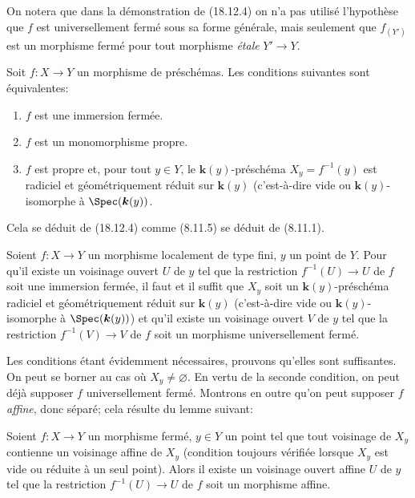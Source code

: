 \begin{remark}[18.12.5]
\label{IV.18.12.5}
On notera que dans la démonstration de (18.12.4) on n'a pas utilisé l'hypothèse que $f$ est universellement fermé sous sa forme générale, mais seulement que $f_{(Y')}$ est un morphisme fermé pour tout morphisme \emph{étale} $Y'\to Y$.
\end{remark}

\begin{corollary}[18.12.6]
\label{IV.18.12.6}
Soit $f:X\to Y$ un morphisme de préschémas. Les conditions suivantes sont équivalentes:
\begin{enumerate}
  \item[\textup{a)}] $f$ est une immersion fermée.
  \item[\textup{b)}] $f$ est un monomorphisme propre.
  \item[\textup{c)}] $f$ est propre et, pour tout $y\in Y$, le $\boldsymbol{k}(y)$-préschéma $X_y=f^{-1}(y)$ est radiciel et géométriquement réduit sur $\boldsymbol{k}(y)$ (c'est-à-dire vide ou $\boldsymbol{k}(y)$-isomorphe à $\Spec(\boldsymbol{k}(y))$.
\end{enumerate}
\end{corollary}

Cela se déduit de (18.12.4) comme (8.11.5) se déduit de (8.11.1).

\begin{proposition}[18.12.7]
\label{IV.18.12.7}
Soient $f:X\to Y$ un morphisme localement de type fini, $y$ un point de $Y$. Pour qu'il existe un voisinage ouvert $U$ de $y$ tel que la restriction $f^{-1}(U)\to U$ de $f$ soit une immersion fermée, il faut et il suffit que $X_y$ soit un $\boldsymbol{k}(y)$-préschéma radiciel et géométriquement réduit sur $\boldsymbol{k}(y)$ (c'est-à-dire vide ou $\boldsymbol{k}(y)$-isomorphe à $\Spec(\boldsymbol{k}(y))$) et qu'il existe un voisinage ouvert $V$ de $y$ tel que la restriction $f^{-1}(V)\to V$ de $f$ soit un morphisme universellement fermé.
\end{proposition}

Les conditions étant évidemment nécessaires, prouvons qu'elles sont suffisantes. On peut se borner au cas où $X_y\neq\varnothing$. En vertu de la seconde condition, on peut déjà supposer $f$ universellement fermé. Montrons en outre qu'on peut supposer $f$ \emph{affine}, donc séparé; cela résulte du lemme suivant:

\begin{lemma}[18.12.7.1]
\label{IV.18.12.7.1}
Soient $f:X\to Y$ un morphisme fermé, $y\in Y$ un point tel que tout voisinage de $X_y$ contienne un voisinage affine de $X_y$ (condition toujours vérifiée lorsque $X_y$ est vide ou réduite à un seul point). Alors il existe un voisinage ouvert affine $U$ de $y$ tel que la restriction $f^{-1}(U)\to U$ de $f$ soit un morphisme affine.
\end{lemma}


